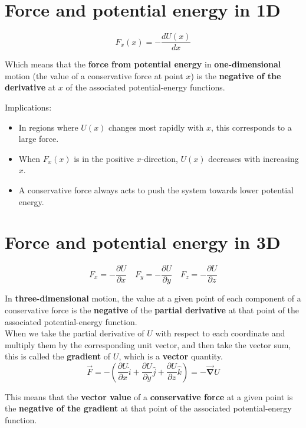 \documentclass[11pt]{article}
\begin{document}
\section{Force and potential energy in 1D}
\label{sec:org12c5599}
\[F_x(x) = - \frac{dU(x)}{dx}\]

Which means that the \textbf{force from potential energy} in \textbf{one-dimensional} motion (the value of a conservative force at point \(x\)) is the \textbf{negative of the derivative} at \(x\) of the associated potential-energy functions.

Implications:
\begin{itemize}
\item In regions where \(U(x)\) changes most rapidly with \(x\), this corresponds to a large force.
\item When \(F_x(x)\) is in the positive \(x\)-direction, \(U(x)\) decreases with increasing \(x\).
\item A conservative force always acts to push the system towards lower potential energy.
\end{itemize}

\newpage

\section{Force and potential energy in 3D}
\label{sec:orga473f50}
\[F_x = -\frac{\partial U}{\partial x} \quad F_y = -\frac{\partial U}{\partial y} \quad F_z = -\frac{\partial U}{\partial z}\]

In \textbf{three-dimensional} motion, the value at a given point of each component of a conservative force is the \textbf{negative} of the \textbf{partial derivative} at that point of the associated potential-energy function.
\\[0pt]

When we take the partial derivative of \(U\) with respect to each coordinate and multiply them by the corresponding unit vector, and then take the vector sum, this is called the \textbf{gradient} of \(U\), which is a \textbf{vector} quantity.
\[\vec{F} = - \left( \frac{\partial U}{\partial x} \hat{i} + \frac{\partial U}{\partial y} \hat{j} + \frac{\partial U}{\partial z} \hat{k} \right) = - \vec{\boldsymbol{\nabla}} U\]

This means that the \textbf{vector value} of a \textbf{conservative force} at a given point is the \textbf{negative of the gradient} at that point of the associated potential-energy function.
\\[0pt]
\end{document}
